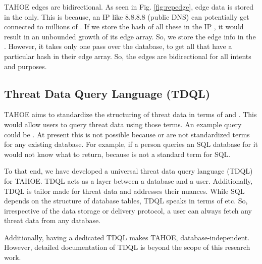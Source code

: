 TAHOE edges are bidirectional. As seen in Fig. \ref{fig:repedge}, edge data is stored in the  only. This is because, an IP like $8.8.8.8$ (public DNS) can potentially get connected to millions of . If we store the hash of all these  in the IP , it would result in an unbounded growth of its edge array. So, we store the edge info in the . However, it takes only one pass over the database, to get all  that have a particular hash in their edge array. So, the edges are bidirectional for all intents and purposes.



\subsection{Threat Data Query Language (TDQL)}\label{ss:tdql}

TAHOE aims to standardize the structuring of threat data in terms of  and . This would allow users to query threat data using those terms. An example query could be . At present this is not possible because  or  are not standardized terms for any existing database. For example, if a person queries an SQL database for  it would not know what to return, because  is not a standard term for SQL.


To that end, we have developed a universal threat data query language (TDQL) for TAHOE. TDQL acts as a layer between a database and a user.  Additionally, TDQL is tailor made for threat data and addresses their nuances. While SQL depends on the structure of database tables, TDQL speaks in terms of  etc. So, irrespective of the data storage or delivery protocol, a user can always fetch any threat data from any database.

Additionally, having a dedicated TDQL makes TAHOE, database-independent. However, detailed documentation of TDQL is beyond the scope of this research work.





























